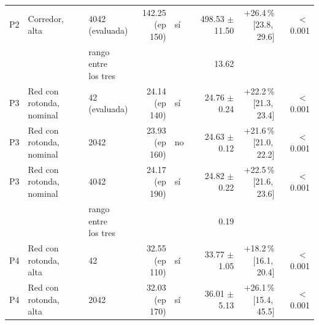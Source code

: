 \begin{table}[H]
\begin{tabular}{lllrlrrr}
P2 & \makecell[l]{Corredor,\\{}alta} & \makecell[l]{4042\\{}(evaluada)} & \makecell[r]{142.25\\{}(ep 150)} & sí & \makecell[r]{498.53\\{}$\pm$ 11.50} & \makecell[r]{+26.4\,\%\\{}[23.8,\,29.6]} & $<$\,0.001 \\
 & & \makecell[l]{rango entre\\{}los tres} & & & 13.62 & & \\
P3 & \makecell[l]{Red con rotonda,\\{}nominal} & \makecell[l]{42\\{}(evaluada)} & \makecell[r]{24.14\\{}(ep 140)} & sí & \makecell[r]{24.76\\{}$\pm$ 0.24} & \makecell[r]{+22.2\,\%\\{}[21.3,\,23.4]} & $<$\,0.001 \\
P3 & \makecell[l]{Red con rotonda,\\{}nominal} & 2042 & \makecell[r]{23.93\\{}(ep 160)} & no & \makecell[r]{24.63\\{}$\pm$ 0.12} & \makecell[r]{+21.6\,\%\\{}[21.0,\,22.2]} & $<$\,0.001 \\
P3 & \makecell[l]{Red con rotonda,\\{}nominal} & 4042 & \makecell[r]{24.17\\{}(ep 190)} & sí & \makecell[r]{24.82\\{}$\pm$ 0.22} & \makecell[r]{+22.5\,\%\\{}[21.6,\,23.6]} & $<$\,0.001 \\
 & & \makecell[l]{rango entre\\{}los tres} & & & 0.19 & & \\
P4 & \makecell[l]{Red con rotonda,\\{}alta} & 42 & \makecell[r]{32.55\\{}(ep 110)} & sí & \makecell[r]{33.77\\{}$\pm$ 1.05} & \makecell[r]{+18.2\,\%\\{}[16.1,\,20.4]} & $<$\,0.001 \\
P4 & \makecell[l]{Red con rotonda,\\{}alta} & 2042 & \makecell[r]{32.03\\{}(ep 170)} & sí & \makecell[r]{36.01\\{}$\pm$ 5.13} & \makecell[r]{+26.1\,\%\\{}[15.4,\,45.5]} & $<$\,0.001 \\

\end{tabular}
\end{table}
